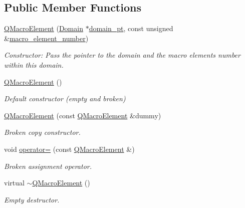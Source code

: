 \subsection*{Public Member Functions}
\begin{DoxyCompactItemize}
\item 
\hyperlink{classoomph_1_1QMacroElement_3_013_01_4_a51599bea29101ab0473485b0815e4797}{Q\+Macro\+Element} (\hyperlink{classoomph_1_1Domain}{Domain} $\ast$\hyperlink{classoomph_1_1MacroElement_ab086ff8cbdb656eff8ab5eafd67bca07}{domain\+\_\+pt}, const unsigned \&\hyperlink{classoomph_1_1MacroElement_acc146caf3839d234c62cf9a4de2fbe91}{macro\+\_\+element\+\_\+number})
\begin{DoxyCompactList}\small\item\em Constructor\+: Pass the pointer to the domain and the macro element\textquotesingle{}s number within this domain. \end{DoxyCompactList}\item 
\hyperlink{classoomph_1_1QMacroElement_3_013_01_4_a52e55e172b74a1a9ea5888b5b06ac552}{Q\+Macro\+Element} ()
\begin{DoxyCompactList}\small\item\em Default constructor (empty and broken) \end{DoxyCompactList}\item 
\hyperlink{classoomph_1_1QMacroElement_3_013_01_4_adbcbf49dc3c075e2c6d0f00763f6035a}{Q\+Macro\+Element} (const \hyperlink{classoomph_1_1QMacroElement}{Q\+Macro\+Element} \&dummy)
\begin{DoxyCompactList}\small\item\em Broken copy constructor. \end{DoxyCompactList}\item 
void \hyperlink{classoomph_1_1QMacroElement_3_013_01_4_ac2cf031abc3bf899a8faca572af67d76}{operator=} (const \hyperlink{classoomph_1_1QMacroElement}{Q\+Macro\+Element} \&)
\begin{DoxyCompactList}\small\item\em Broken assignment operator. \end{DoxyCompactList}\item 
virtual \hyperlink{classoomph_1_1QMacroElement_3_013_01_4_a61243dc73167dac67eec6c02e6b35d5d}{$\sim$\+Q\+Macro\+Element} ()
\begin{DoxyCompactList}\small\item\em Empty destructor. \end{DoxyCompactList}\item 

\end{DoxyCompactItemize}
